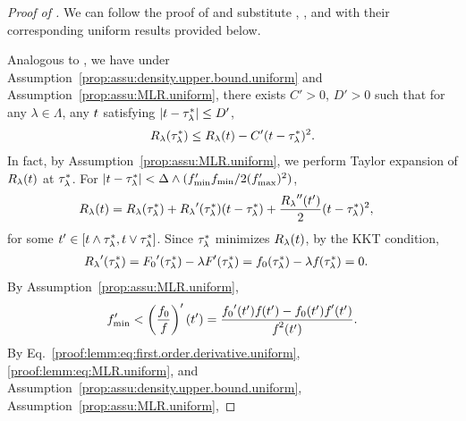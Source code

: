 \begin{proof}[Proof of ]
We can follow the proof of  and substitute , , and  with their corresponding uniform results provided below.

Analogous to , we have under Assumption~\ref{prop:assu:density.upper.bound.uniform} and Assumption~\ref{prop:assu:MLR.uniform}, there exists $C' > 0$, $D' > 0$ such that for any $\lambda \in \Lambda$, any ${t}$ satisfying $\left|{t} - {\tau^*_\lambda} \right| \le D'$,
\begin{align}\label{eq:lemm:risk.valley.uniform}
    {R_{\lambda}}({\tau^*_\lambda}) \le {R_{\lambda}}({t}) - C' ({t} - {\tau^*_\lambda})^2.
\end{align}
In fact, by Assumption~\ref{prop:assu:MLR.uniform}, we perform Taylor expansion of ${R_{\lambda}}({t})$ at ${\tau^*_\lambda}$. For $|{t} - {\tau^*_\lambda}| <  \Delta \wedge (f_{\min}' f_{\min}/2(f_{\max}')^2)$, \begin{align}\label{proof:lemm:eq:taylor.expansion.uniform}
        {R_{\lambda}}({t})
        &= {R_{\lambda}}({\tau^*_\lambda}) + {R_{\lambda}}'({\tau^*_\lambda}) ({t} - {\tau^*_\lambda}) + \frac{{R_{\lambda}}''({t}')}{2}({t} - {\tau^*_\lambda})^2,
    \end{align}
    for some ${t}' \in [t \wedge {\tau^*_\lambda}, t \vee {\tau^*_\lambda}]$.
    Since ${\tau^*_\lambda}$ minimizes ${R_{\lambda}}({t})$, by the KKT condition,    \begin{align}\label{proof:lemm:eq:first.order.derivative.uniform}
        {R_{\lambda}}'({\tau^*_\lambda})
        &= {F_{0}}'({\tau^*_\lambda}) - \lambda {F_{}}'({\tau^*_\lambda})
        = {f_{0}}({\tau^*_\lambda}) - \lambda {f_{}}({\tau^*_\lambda})
        = 0.
    \end{align}
    By Assumption~\ref{prop:assu:MLR.uniform},
    \begin{align}\label{proof:lemm:eq:MLR.uniform}
        f_{\min}' < \left(\frac{{f_{0}}}{{f_{}}}\right)'({t}')
        = \frac{{f_{0}}'{}({t}') {f_{}}({t}') - {f_{0}}{}({t}') {f_{}}'({t}')}{{f_{}}^2({t}')}.
    \end{align}
    By Eq.~\eqref{proof:lemm:eq:first.order.derivative.uniform}, \eqref{proof:lemm:eq:MLR.uniform}, and Assumption~\ref{prop:assu:density.upper.bound.uniform}, Assumption~\ref{prop:assu:MLR.uniform},

\end{proof}
